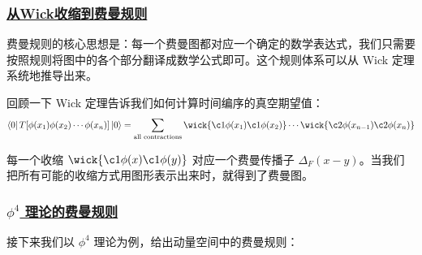 \subsubsection{\protect\hyperlink{:}{从Wick收缩到费曼规则}}

费曼规则的核心思想是：每一个费曼图都对应一个确定的数学表达式，我们只需要按照规则将图中的各个部分翻译成数学公式即可。这个规则体系可以从 Wick 定理系统地推导出来。

回顾一下 Wick 定理告诉我们如何计算时间编序的真空期望值：
\begin{equation*}
    \bra{0}T[\phi(x_1)\phi(x_2)\cdots\phi(x_n)]\ket{0} = \sum_{\text{all contractions}} \wick{\c1 \phi(x_1) \c1 \phi(x_2)} \cdots \wick{\c2 \phi(x_{n-1}) \c2 \phi(x_n)}
\end{equation*}

每一个收缩 $\wick{\c1 \phi(x) \c1 \phi(y)}$ 对应一个费曼传播子 $\Delta_F(x-y)$。当我们把所有可能的收缩方式用图形表示出来时，就得到了费曼图。

\subsubsection{\protect\hyperlink{:}{$\phi^4$ 理论的费曼规则}}

接下来我们以 $\phi^4$ 理论为例，给出动量空间中的费曼规则：

